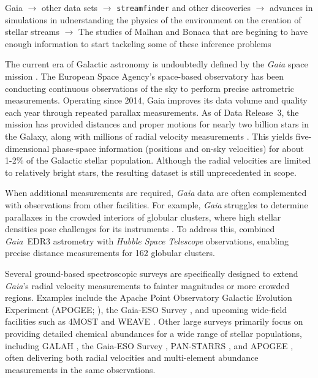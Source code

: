     Gaia $\rightarrow$ other data sets $\rightarrow$ \texttt{streamfinder} and other discoveries $\rightarrow$ advances in simulations in udnerstanding the physics of the environment on the creation of stellar streams $\rightarrow$ The studies of Malhan and Bonaca that are begining to have enough information to start tackeling some of these inference problems 

    The current era of Galactic astronomy is undoubtedly defined by the \emph{Gaia} space mission \citep{2016A&A...595A...1G,2016A&A...595A...2G,2018A&A...616A...1G,2021A&A...650C...3G,2023A&A...674A...1G}. The European Space Agency's space-based observatory has been conducting continuous observations of the sky to perform precise astrometric measurements. Operating since 2014, Gaia improves its data volume and quality each year through repeated parallax measurements.  As of Data Release~3, the mission has provided distances and proper motions for nearly two billion stars in the Galaxy, along with millions of radial velocity measurements \citep{2023A&A...674A...1G}. This yields five-dimensional phase-space information (positions and on-sky velocities) for about 1-2\% of the Galactic stellar population. Although the radial velocities are limited to relatively bright stars, the resulting dataset is still unprecedented in scope.

    When additional measurements are required, \emph{Gaia} data are often complemented with observations from other facilities.  For example, \emph{Gaia} struggles to determine parallaxes in the crowded interiors of globular clusters, where high stellar densities pose challenges for its instruments \citep{2017MNRAS.467..412P}. To address this, \citet{2021MNRAS.505.5957B} combined \emph{Gaia}~EDR3 astrometry with \emph{Hubble Space Telescope} observations, enabling precise distance measurements for 162 globular clusters.

    Several ground-based spectroscopic surveys are specifically designed to extend \emph{Gaia}'s radial velocity measurements to fainter magnitudes or more crowded regions.  Examples include the Apache Point Observatory Galactic Evolution Experiment (APOGEE; \citep{2017AJ....154...94M}), the Gaia-ESO Survey \citep{2023A&A...676A.129H}, and upcoming wide-field facilities such as 4MOST \citep{2019Msngr.175....3D} and WEAVE \citep{2014SPIE.9147E..0LD}.  Other large surveys primarily focus on providing detailed chemical abundances for a wide range of stellar populations, including GALAH \citep{2012ASPC..458..421Z}, the Gaia-ESO Survey \citep{2023A&A...676A.129H}, PAN-STARRS \citep{2016arXiv161205560C}, and APOGEE \citep{2017AJ....154...94M}, often delivering both radial velocities and multi-element abundance measurements in the same observations.

